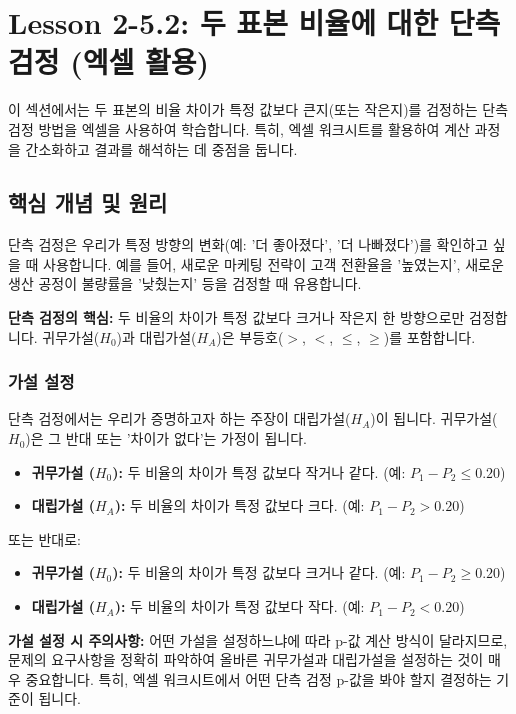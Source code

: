 \documentclass[11pt,a4paper]{article}
\begin{document}
\newpage
\section{Lesson 2-5.2: 두 표본 비율에 대한 단측 검정 (엑셀 활용)}

이 섹션에서는 두 표본의 비율 차이가 특정 값보다 큰지(또는 작은지)를 검정하는 단측 검정 방법을 엑셀을 사용하여 학습합니다. 특히, 엑셀 워크시트를 활용하여 계산 과정을 간소화하고 결과를 해석하는 데 중점을 둡니다.

\subsection{핵심 개념 및 원리}

단측 검정은 우리가 특정 방향의 변화(예: '더 좋아졌다', '더 나빠졌다')를 확인하고 싶을 때 사용합니다. 예를 들어, 새로운 마케팅 전략이 고객 전환율을 '높였는지', 새로운 생산 공정이 불량률을 '낮췄는지' 등을 검정할 때 유용합니다.

\begin{summarybox}
\textbf{단측 검정의 핵심:}
두 비율의 차이가 특정 값보다 크거나 작은지 한 방향으로만 검정합니다.
귀무가설($H_0$)과 대립가설($H_A$)은 부등호($>$, $<$, $\le$, $\ge$)를 포함합니다.
\end{summarybox}

\subsubsection{가설 설정}
단측 검정에서는 우리가 증명하고자 하는 주장이 대립가설($H_A$)이 됩니다. 귀무가설($H_0$)은 그 반대 또는 '차이가 없다'는 가정이 됩니다.

\begin{itemize}
    \item \textbf{귀무가설 ($H_0$):} 두 비율의 차이가 특정 값보다 작거나 같다. (예: $P_1 - P_2 \le 0.20$)
    \item \textbf{대립가설 ($H_A$):} 두 비율의 차이가 특정 값보다 크다. (예: $P_1 - P_2 > 0.20$)
\end{itemize}
또는 반대로:
\begin{itemize}
    \item \textbf{귀무가설 ($H_0$):} 두 비율의 차이가 특정 값보다 크거나 같다. (예: $P_1 - P_2 \ge 0.20$)
    \item \textbf{대립가설 ($H_A$):} 두 비율의 차이가 특정 값보다 작다. (예: $P_1 - P_2 < 0.20$)
\end{itemize}

\begin{cautionbox}
\textbf{가설 설정 시 주의사항:}
어떤 가설을 설정하느냐에 따라 p-값 계산 방식이 달라지므로, 문제의 요구사항을 정확히 파악하여 올바른 귀무가설과 대립가설을 설정하는 것이 매우 중요합니다. 특히, 엑셀 워크시트에서 어떤 단측 검정 p-값을 봐야 할지 결정하는 기준이 됩니다.
\end{cautionbox}
\end{document}
